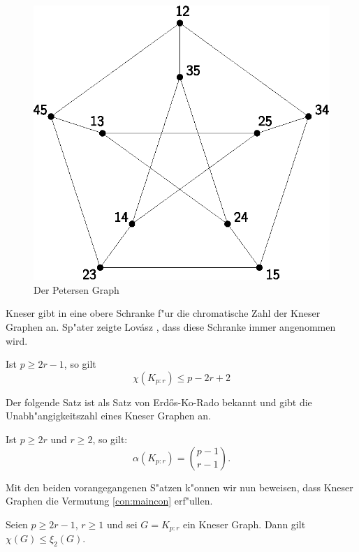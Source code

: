 \begin{figure}[h]
  \centering
  \includegraphics{images/petersen}
  \caption{Der Petersen Graph}
  \label{fig:petersen}
\end{figure}
Kneser gibt in \cite{Kneser55} eine obere Schranke f"ur die chromatische Zahl der Kneser Graphen an. Sp"ater zeigte Lov\'asz , dass diese Schranke immer angenommen wird.
\begin{theorem}
  Ist $p\geq 2r-1$, so gilt
  $$\chi(K_{p:r}) \leq p-2r+2$$ \label{thm:kneserfarbung}
\end{theorem}
Der folgende Satz ist als Satz von Erd\H{o}s-Ko-Rado \cite{ErdosKoRado61} bekannt und gibt die Unabh"angigkeitszahl eines Kneser Graphen an.
\begin{theorem}
  Ist $p\geq 2r$ und $r \geq 2$, so gilt: 
  $$\alpha(K_{p:r})= \binom{p-1}{r-1}.$$
  \label{thm:ErdosKoRado}
\end{theorem}
Mit den beiden vorangegangenen S"atzen k"onnen wir nun beweisen, dass Kneser Graphen die Vermutung \ref{con:maincon} erf"ullen.
\begin{proposition}
  Seien $p\geq 2r-1$, $r\geq 1$ und sei $G= K_{p:r}$ ein Kneser Graph. Dann gilt $\chi(G) \leq \xi_{2}(G)$. 
\end{proposition}
